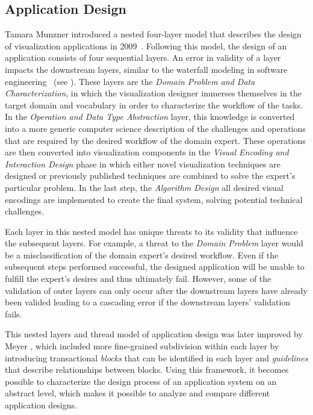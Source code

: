 \subsection{Application Design} \label{cha:intro:appl:design}
Tamara Munzner introduced a nested four-layer model that describes the design of visualization applications in 2009~\cite{munzner2009nested}.  Following this model, the design of an application consists of four sequential layers.  An error in validity of a layer impacts the downstream layers, similar to the waterfall modeling in software engineering~\cite{royce1987managing} (see ).  These layers are the \emph{Domain Problem and Data Characterization}, in which the visualization designer immerses themselves in the target domain and vocabulary in order to characterize the workflow of the tasks.  In the \emph{Operation and Data Type Abstraction} layer, this knowledge is converted into a more generic computer science description of the challenges and operations that are required by the desired workflow of the domain expert.  These operations are then converted into visualization components in the \emph{Visual Encoding and Interaction Design} phase in which either novel visualization techniques are designed or previously published techniques are combined to solve the expert's particular problem.  In the last step, the \emph{Algorithm Design} all desired visual encodings are implemented to create the final system, solving potential technical challenges.

Each layer in this nested model has unique threats to its validity that influence the subsequent layers.  For example, a threat to the \emph{Domain Problem} layer would be a misclassification of the domain expert's desired workflow.  Even if the subsequent steps performed successful, the designed application will be unable to fulfill the expert's desires and thus ultimately fail.  However, some of the validation of outer layers can only occur after the downstream layers have already been valided leading to a cascading error if the downstream layers' validation fails.

This nested layers and thread model of application design was later improved by Meyer \etal , which included more fine-grained subdivision within each layer by introducing transactional \emph{blocks} that can be identified in each layer and \emph{guidelines} that describe relationships between blocks.  Using this framework, it becomes possible to characterize the design process of an application system on an abstract level, which makes it possible to analyze and compare different application designs.



